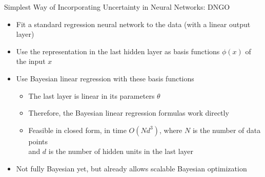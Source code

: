 
\begin{frame}[c]{Simplest Way of Incorporating Uncertainty in Neural Networks: DNGO}


\begin{itemize}
    \item Fit a standard regression neural network to the data (with a linear output layer)
    \item Use the representation in the last hidden layer as \alert{basis functions $\phi(x)$} of the input $x$ 
    \item \alert{Use Bayesian linear regression with these basis functions} \fhpause
    \begin{itemize}
        \item The last layer is linear in its parameters $\theta$  
        \item Therefore, the Bayesian linear regression formulas work directly 
        \item Feasible in closed form, in time $O(N d^3)$, where $N$ is the number of data points\\ and $d$ is the number of hidden units in the last layer 
    \end{itemize}
    \item Not fully Bayesian yet, but already allows scalable Bayesian optimization 

\end{itemize}


\end{frame}



